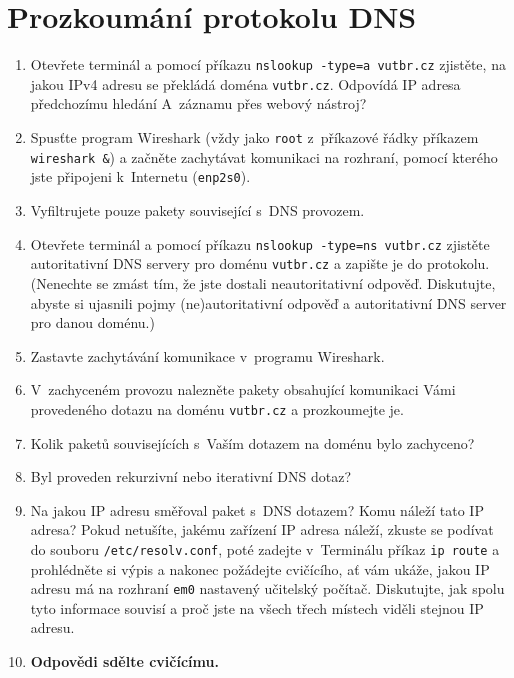 \section{Prozkoumání protokolu DNS}
\begin{enumerate}
    \item Otevřete terminál a pomocí příkazu \texttt{nslookup -type=a vutbr.cz} zjistěte, na jakou IPv4 adresu se překládá doména \texttt{vutbr.cz}. Odpovídá IP adresa předchozímu hledání A~záznamu přes webový nástroj?
    \item Spusťte program Wireshark (vždy jako \texttt{root} z~příkazové řádky příkazem \texttt{wireshark \&}) a začněte zachytávat komunikaci na rozhraní, pomocí kterého jste připojeni k~Internetu (\texttt{enp2s0}).
	\item Vyfiltrujete pouze pakety související s~DNS provozem.
    \item Otevřete terminál a pomocí příkazu \texttt{nslookup -type=ns vutbr.cz} zjistěte autoritativní DNS servery pro doménu \texttt{vutbr.cz} a zapište je do protokolu. (Nenechte se zmást tím, že jste dostali neautoritativní odpověď. Diskutujte, abyste si ujasnili pojmy (ne)autoritativní odpověď a autoritativní DNS server pro danou doménu.)
    \item Zastavte zachytávání komunikace v~programu Wireshark.
    \item V~zachyceném provozu nalezněte pakety obsahující komunikaci Vámi provedeného dotazu na doménu \texttt{vutbr.cz} a prozkoumejte je.
	\item Kolik paketů souvisejících s~Vaším dotazem na doménu bylo zachyceno?
	\item Byl proveden rekurzivní nebo iterativní DNS dotaz?
	\item Na jakou IP adresu směřoval paket s~DNS dotazem? Komu náleží tato IP adresa? Pokud netušíte, jakému zařízení IP adresa náleží, zkuste se podívat do souboru \texttt{/etc/resolv.conf}, poté zadejte v~Terminálu příkaz \texttt{ip route} a prohlédněte si výpis a nakonec požádejte cvičícího, ať vám ukáže, jakou IP adresu má na rozhraní \texttt{em0} nastavený učitelský počítač. Diskutujte, jak spolu tyto informace souvisí a proč jste na všech třech místech viděli stejnou IP adresu.
	\item \textbf{Odpovědi sdělte cvičícímu.}

\end{enumerate}

